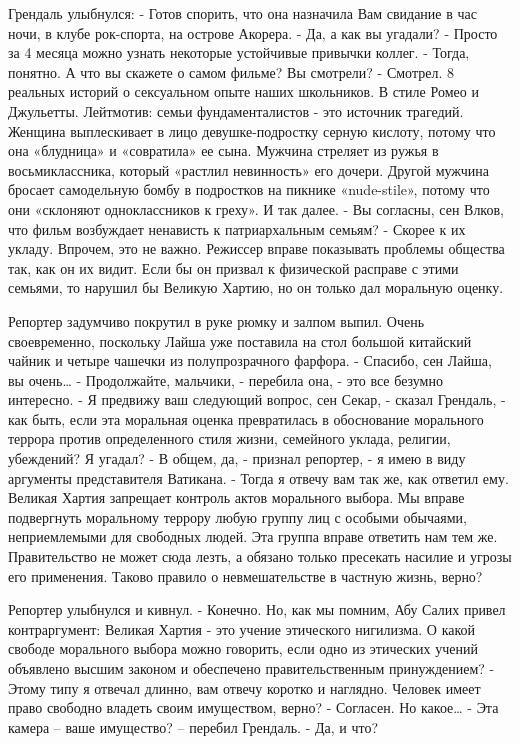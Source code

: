 \documentclass{book}
\begin{document}
Грендаль улыбнулся:
- Готов спорить, что она назначила Вам свидание в час ночи, в клубе рок-спорта, на острове Акорера.
- Да, а как вы угадали?
- Просто за 4 месяца можно узнать некоторые устойчивые привычки коллег.
- Тогда, понятно. А что вы скажете о самом фильме? Вы смотрели?
- Смотрел. 8 реальных историй о сексуальном опыте наших школьников. В стиле Ромео и Джульетты. Лейтмотив: семьи фундаменталистов - это источник трагедий. Женщина выплескивает в лицо девушке-подростку серную кислоту, потому что она «блудница» и «совратила» ее сына. Мужчина стреляет из ружья в восьмиклассника, который «растлил невинность» его дочери. Другой мужчина бросает самодельную бомбу в подростков на пикнике «nude-stile», потому что они «склоняют одноклассников к греху». И так далее.
- Вы согласны, сен Влков, что фильм возбуждает ненависть к патриархальным семьям?
- Скорее к их укладу. Впрочем, это не важно. Режиссер вправе показывать проблемы общества так, как он их видит. Если бы он призвал к физической расправе с этими семьями, то нарушил бы Великую Хартию, но он только дал моральную оценку.

Репортер задумчиво покрутил в руке рюмку и залпом выпил. Очень своевременно, поскольку Лайша уже поставила на стол большой китайский чайник и четыре чашечки из полупрозрачного фарфора.
- Спасибо, сен Лайша, вы очень\ldots{}
- Продолжайте, мальчики, - перебила она, - это все безумно интересно.
- Я предвижу ваш следующий вопрос, сен Секар, - сказал Грендаль, - как быть, если эта моральная оценка превратилась в обоснование морального террора против определенного стиля жизни, семейного уклада, религии, убеждений? Я угадал?
- В общем, да, - признал репортер, - я имею в виду аргументы представителя Ватикана.
- Тогда я отвечу вам так же, как ответил ему. Великая Хартия запрещает контроль актов морального выбора. Мы вправе подвергнуть моральному террору любую группу лиц с особыми обычаями, неприемлемыми для свободных людей. Эта группа вправе ответить нам тем же. Правительство не может сюда лезть, а обязано только пресекать насилие и угрозы его применения. Таково правило о невмешательстве в частную жизнь, верно?

Репортер улыбнулся и кивнул.
- Конечно. Но, как мы помним, Абу Салих привел контраргумент: Великая Хартия - это учение этического нигилизма. О какой свободе морального выбора можно говорить, если одно из этических учений объявлено высшим законом и обеспечено правительственным принуждением?
- Этому типу я отвечал длинно, вам отвечу коротко и наглядно. Человек имеет право свободно владеть своим имуществом, верно?
- Согласен. Но какое\ldots{}
- Эта камера -- ваше имущество? -- перебил Грендаль.
- Да, и что?
\end{document}
